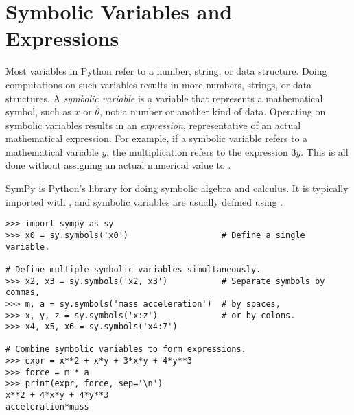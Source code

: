 

\section*{Symbolic Variables and Expressions} %

Most variables in Python refer to a number, string, or data structure.
Doing computations on such variables results in more numbers, strings, or data structures.
A \emph{symbolic variable} is a variable that represents a mathematical symbol, such as $x$ or $\theta$, not a number or another kind of data.
Operating on symbolic variables results in an \emph{expression}, representative of an actual mathematical expression.
For example, if a symbolic variable  refers to a mathematical variable $y$, the multiplication  refers to the expression $3y$.
This is all done without assigning an actual numerical value to .

SymPy is Python's library for doing symbolic algebra and calculus.
It is typically imported with , and symbolic variables are usually defined using .

\begin{lstlisting}
>>> import sympy as sy
>>> x0 = sy.symbols('x0')                   # Define a single variable.

# Define multiple symbolic variables simultaneously.
>>> x2, x3 = sy.symbols('x2, x3')           # Separate symbols by commas,
>>> m, a = sy.symbols('mass acceleration')  # by spaces,
>>> x, y, z = sy.symbols('x:z')             # or by colons.
>>> x4, x5, x6 = sy.symbols('x4:7')

# Combine symbolic variables to form expressions.
>>> expr = x**2 + x*y + 3*x*y + 4*y**3
>>> force = m * a
>>> print(expr, force, sep='\n')
x**2 + 4*x*y + 4*y**3
acceleration*mass
\end{lstlisting}
%


